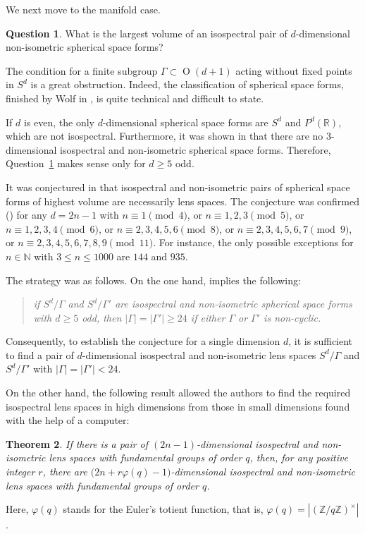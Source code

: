 \documentclass[12pt,a4paper,final]{amsart}
\theoremstyle{plain}
\newtheorem{theorem}{Theorem}[section]
\theoremstyle{definition}
\newtheorem{question}[theorem]{Question}
\theoremstyle{remark}
\numberwithin{equation}{section}
\newcommand{\N}{\mathbb N}
\newcommand{\Z}{\mathbb Z}
\newcommand{\R}{\mathbb R}
\DeclareMathOperator{\Ot}{O}
\begin{document}
  
We next move to the manifold case. 



\begin{question}\label{question:highestvolume-manifold}
What is the largest volume of an isospectral pair of $d$-dimensional non-isometric spherical space forms?
\end{question}


The condition for a finite subgroup $\Gamma\subset \Ot(d+1)$ acting without fixed points in $S^d$ is a great obstruction. 
Indeed, the classification of spherical space forms, finished by Wolf in \cite{Wolf-book}, is quite technical and difficult to state. 

If $d$ is even, the only $d$-dimensional spherical space forms are $S^d$ and $P^d(\R)$, which are not isospectral. 
Furthermore, it was shown in \cite{Ikeda80_isosp-lens} that there are no $3$-dimensional isospectral and non-isometric spherical space forms.
Therefore, Question~\ref{question:highestvolume-manifold} makes sense only for $d\geq5$ odd. 

It was conjectured in \cite{LauretLinowitz} that isospectral and non-isometric pairs of spherical space forms of highest volume are necessarily lens spaces. 
The conjecture was confirmed (\cite[Thm.~1.7]{LauretLinowitz}) for any $d=2n-1$ with $n\equiv 1\pmod 4$, or $n\equiv 1,2,3\pmod 5$, or $n\equiv 1,2,3,4\pmod 6$, or $n\equiv 2,3,4,5,6\pmod 8$, or $n\equiv 2,3,4,5,6,7\pmod 9$, or $n\equiv 2,3,4,5,6,7,8,9\pmod{11}$. 
For instance, the only possible exceptions for $n\in\N$ with $3\leq n\leq 1000$ are $144$ and $935$. 


The strategy was as follows. 
On the one hand, \cite[Lem.~4.4]{LauretLinowitz} implies the following:  
\begin{quote}
\it
if $S^d/\Gamma$ and $S^d/\Gamma'$ are isospectral and non-isometric spherical space forms with $d\geq5$ odd, then $|\Gamma|=|\Gamma'|\geq 24$ if either $\Gamma$ or $\Gamma'$ is non-cyclic.
\end{quote} 
Consequently, to establish the conjecture for a single dimension $d$, it is sufficient to find a pair of $d$-dimensional isospectral and non-isometric lens spaces $S^d/\Gamma$ and $S^d/\Gamma'$ with $|\Gamma|=|\Gamma'|< 24$. 

On the other hand, the following result allowed the authors to find the required isospectral lens spaces in high dimensions from those in small dimensions found with the help of a computer:

\begin{theorem} \cite[Thm.~4.6]{LauretLinowitz} \label{thm:crece-dimension}
If there is a pair of $(2n-1)$-dimensional isospectral and non-isometric lens spaces with fundamental groups of order $q$, then, for any positive integer $r$, there are $\big(2n+r\varphi(q)-1\big)$-dimensional isospectral and non-isometric lens spaces with fundamental groups of order $q$. 
\end{theorem}
Here, $\varphi(q)$ stands for the Euler's totient function, that is, $\varphi(q)=|(\Z/q\Z)^\times|$. 
\end{document}
